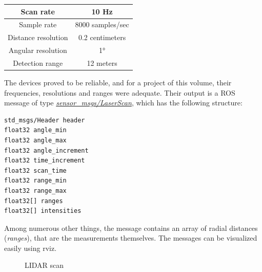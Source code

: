 \begin{center}
    \begin{tabular}{ | c | c | }
        \hline
        Scan rate           & 10 Hz            \\
        \hline
        Sample rate         & 8000 samples/sec \\
        \hline 
        Distance resolution & 0.2 centimeters  \\
        \hline 
        Angular resolution  & 1°               \\
        \hline 
        Detection range     & 12 meters        \\
        \hline
    \end{tabular}
\end{center}

The devices proved to be reliable, and for a project of this volume, their frequencies, resolutions and ranges were adequate. Their output is a ROS message of type \href{http://docs.ros.org/melodic/api/sensor_msgs/html/msg/LaserScan.html}{\textit{sensor\_msgs/LaserScan}}, which has the following structure:

\begin{minipage}{\textwidth}
\begin{lstlisting}[language=IDL]
std_msgs/Header header
float32 angle_min
float32 angle_max
float32 angle_increment
float32 time_increment
float32 scan_time
float32 range_min
float32 range_max
float32[] ranges
float32[] intensities
\end{lstlisting}
\end{minipage}

Among numerous other things, the message contains an array of radial distances (\textit{ranges}), that are the measurements themselves. The messages can be visualized easily using rviz.

\begin{figure}[!ht]
    \centering
    \caption{LIDAR scan}
    \label{lidar_scan}
\end{figure}

